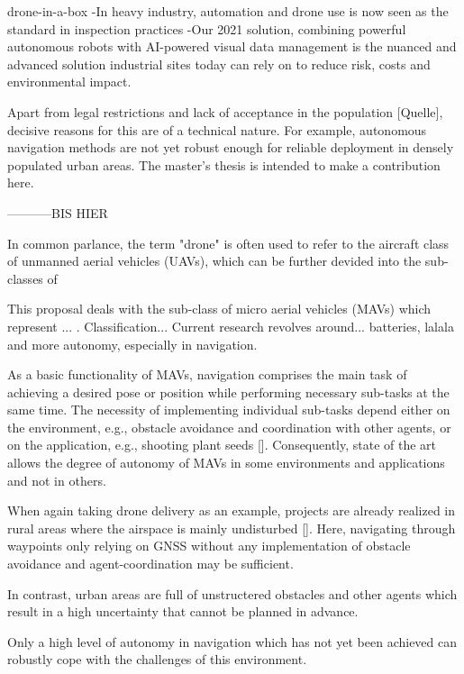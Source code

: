 drone-in-a-box %
-In heavy industry, automation and drone use is now seen as the standard in inspection practices
-Our 2021 solution, combining powerful autonomous robots with AI-powered visual data management is the nuanced and advanced solution industrial sites today can rely on to reduce risk, costs and environmental impact.

Apart from legal restrictions and lack of acceptance in the population [Quelle], 
decisive reasons for this are of a technical nature.
For example, autonomous navigation methods are not yet robust enough
for reliable deployment in densely populated urban areas.\cite{loquercio2018learning}
The master's thesis is intended to make a contribution here.


-----------BIS HIER



In common parlance, the term "drone" is often used to refer 
to the aircraft class of unmanned aerial vehicles (UAVs),
which can be further devided into the sub-classes of


This proposal deals with the sub-class of micro aerial vehicles (MAVs)
which represent ...
.
Classification...
Current research revolves around... batteries, lalala
and more autonomy, especially in navigation.





As a basic functionality of MAVs, navigation
comprises the main task of achieving a desired pose or position
while performing necessary sub-tasks at the same time.
The necessity of implementing individual sub-tasks depend either on the environment,
e.g., obstacle avoidance and coordination with other agents,
or on the application,
e.g., shooting plant seeds [].
Consequently, state of the art allows the degree of autonomy 
of MAVs in some environments and applications and not in others.

When again taking drone delivery as an example,
projects are already realized in rural areas where the airspace is mainly undisturbed [].
Here, navigating through waypoints only relying on GNSS 
without any implementation of obstacle avoidance and agent-coordination may be sufficient. 

In contrast, urban areas are full of unstructered obstacles and other agents 
which result in a high uncertainty that cannot be planned in advance. 

Only a high level of autonomy in navigation which has not yet been achieved
can robustly cope with the challenges of this environment.


